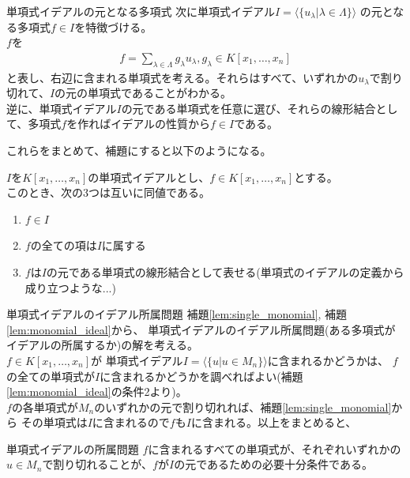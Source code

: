 \begin{frame} {単項式イデアルの元となる多項式}
	次に単項式イデアル$I=\langle \{ u_{\lambda} | \lambda \in \Lambda \} \rangle$
	の元となる多項式$f \in I$を特徴づける。\\
	$f$を
	\begin{align*}
		f = \sum_{\lambda \in \Lambda} g_{\lambda} u_{\lambda}, g_{\lambda} \in K[x_1, \ldots, x_n]
	\end{align*}
	と表し、右辺に含まれる単項式を考える。それらはすべて、いずれかの$u_{\lambda}$で割り切れて、$I$の元の単項式であることがわかる。\\
	逆に、単項式イデアル$I$の元である単項式を任意に選び、それらの線形結合として、多項式$f$を作ればイデアルの性質から$f \in I$である。\\

\end{frame}

\begin{frame}
	これらをまとめて、補題にすると以下のようになる。
	\begin{lemma}
		\label{lem:monomial_ideal}
		$I$を$K[x_1, \ldots, x_n]$の単項式イデアルとし、$f \in K[x_1, \ldots, x_n]$とする。\\
		このとき、次の3つは互いに同値である。\\
		\begin{enumerate}
			\item $f \in I$
			\item $f$の全ての項は$I$に属する
			\item $f$は$I$の元である単項式の線形結合として表せる(単項式のイデアルの定義から成り立つような...)
		\end{enumerate}
	\end{lemma}
\end{frame}

\begin{frame} {単項式イデアルのイデアル所属問題}
	補題\ref{lem:single_monomial}, 補題\ref{lem:monomial_ideal}から、
	単項式イデアルのイデアル所属問題(ある多項式がイデアルの所属するか)の解を考える。\\
	$f \in K[x_1, \ldots, x_n]$が
	単項式イデアル$I = \langle \{ u |u \in M_n \} \rangle$に含まれるかどうかは、
	$f$の全ての単項式が$I$に含まれるかどうかを調べればよい(補題\ref{lem:monomial_ideal}の条件2より)。\\
	$f$の各単項式が$M_n$のいずれかの元で割り切れれば、補題\ref{lem:single_monomial}から
	その単項式は$I$に含まれるので$f$も$I$に含まれる。以上をまとめると、\\
	\begin{block} {単項式イデアルの所属問題}
		$f$に含まれるすべての単項式が、それぞれいずれかの$u \in M_n$で割り切れることが、$f$が$I$の元であるための必要十分条件である。
	\end{block}
\end{frame}

